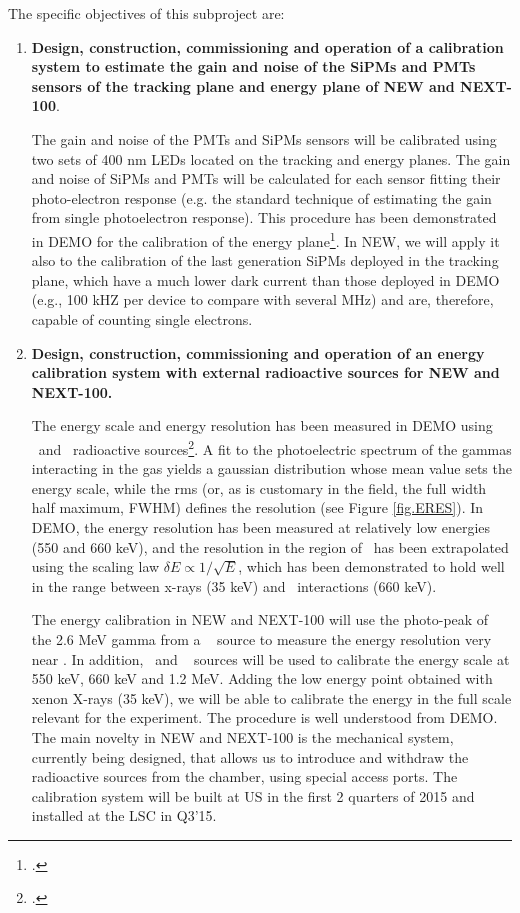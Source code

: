 The specific objectives of this subproject are:
\begin{enumerate}
\item {\bf Design, construction, commissioning and operation of a calibration system to estimate the gain and noise of the SiPMs and PMTs sensors of the tracking plane and energy plane of NEW and NEXT-100}. 

The gain and noise of the PMTs and SiPMs sensors will be calibrated using two sets of 400 nm LEDs located on the tracking and energy planes. The gain and noise of SiPMs and PMTs will be calculated for each sensor fitting their photo-electron response (e.g. the standard technique of estimating the gain from single photoelectron response). This procedure has been demonstrated in DEMO for the calibration of the energy plane\footcite{Lorca:2014sra}. In NEW, we will apply it also to the calibration of the last generation SiPMs deployed in the tracking plane, which have a much lower dark current than those deployed in DEMO (e.g., 100 kHZ per device to compare with several MHz) and are, therefore, capable of counting single electrons.

\item {\bf Design, construction, commissioning and operation of an energy calibration system with external radioactive sources for NEW and NEXT-100.}

The energy scale and energy resolution has been measured in DEMO using \NA\ and \CS\ radioactive sources\footcite{Alvarez:2012nd,Alvarez:2013gxa}. A fit to the photoelectric spectrum of the gammas interacting in the gas yields a gaussian distribution whose mean value sets the energy scale, while the rms (or, as is customary in the field, the full width half maximum, FWHM) defines the resolution (see Figure \ref{fig.ERES}). In DEMO, the energy resolution has been measured at relatively low energies (550 and 660 keV), and the resolution in the region of \Qbb\ has been extrapolated using the scaling law $\delta E \propto 1/\sqrt{E}$, which has been demonstrated to hold well in the range between x-rays (35 keV) and \CS\ interactions (660 keV). 

The energy calibration in NEW and NEXT-100 will use the photo-peak of the 2.6 MeV gamma from a \Tl~  source to measure the energy resolution very near \Qbb. In addition, \NA\ and \CS~ sources will be used to calibrate the energy scale at  550 keV, 660 keV and 1.2 MeV. Adding the low energy point obtained with xenon X-rays (35 keV), we will be able to calibrate the energy in the full scale relevant for the experiment. The procedure is well understood from DEMO. The main novelty in NEW and NEXT-100 is the mechanical system, currently being designed, that allows us to introduce and withdraw the radioactive sources from the chamber, using special access ports. The calibration system will be built at US in the first 2 quarters of 2015 and installed at the LSC in Q3'15.


\end{enumerate}
